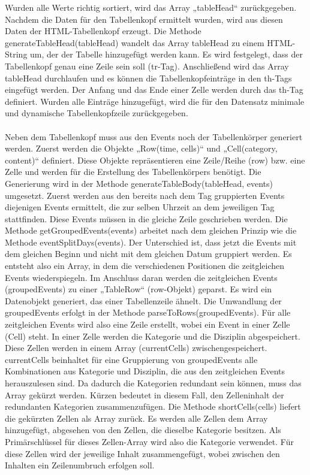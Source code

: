 Wurden alle Werte richtig sortiert, wird das Array „tableHead“ zurückgegeben.
Nachdem die Daten für den Tabellenkopf ermittelt wurden, wird aus diesen Daten der HTML-Tabellenkopf erzeugt. Die Methode generateTableHead(tableHead) wandelt das Array tableHead zu einem HTML-String um, der der Tabelle hinzugefügt werden kann. Es wird festgelegt, dass der Tabellenkopf genau eine Zeile sein soll (tr-Tag). Anschließend wird das Array tableHead durchlaufen und es können die Tabellenkopfeinträge in den th-Tags eingefügt werden. Der Anfang und das Ende einer Zelle werden durch das th-Tag definiert. Wurden alle Einträge hinzugefügt, wird die für den Datensatz minimale und dynamische Tabellenkopfzeile zurückgegeben.\\
\\
Neben dem Tabellenkopf muss aus den Events noch der Tabellenkörper generiert werden. Zuerst werden die Objekte „Row(time, cells)“ und „Cell(category, content)“ definiert. Diese Objekte repräsentieren eine Zeile/Reihe (row) bzw. eine Zelle und werden für die Erstellung des Tabellenkörpers benötigt. 
Die Generierung wird in der Methode generateTableBody(tableHead, events) umgesetzt. Zuerst werden aus den bereits nach dem Tag gruppierten Events diejenigen Events ermittelt, die zur selben Uhrzeit an dem jeweiligen Tag stattfinden. Diese Events müssen in die gleiche Zeile geschrieben werden. Die Methode getGroupedEvents(events) arbeitet nach dem gleichen Prinzip wie die Methode eventSplitDays(events). Der Unterschied ist, dass jetzt die Events mit dem gleichen Beginn und nicht mit dem gleichen Datum gruppiert werden. Es entsteht also ein Array, in dem die verschiedenen Positionen die zeitgleichen Events wiederspiegeln.
Im Anschluss daran werden die zeitgleichen Events (groupedEvents) zu einer „TableRow“ (row-Objekt) geparst. Es wird ein Datenobjekt generiert, das einer Tabellenzeile ähnelt. Die Umwandlung der groupedEvents erfolgt in der Methode parseToRows(groupedEvents). Für alle zeitgleichen Events wird also eine Zeile erstellt, wobei ein Event in einer Zelle (Cell) steht. In einer Zelle werden die Kategorie und die Disziplin abgespeichert. Diese Zellen werden in einem Array (currentCells) zwischengespeichert. currentCells beinhaltet für eine Gruppierung von groupedEvents alle Kombinationen aus Kategorie und Disziplin, die aus den zeitgleichen Events herauszulesen sind. Da dadurch die Kategorien redundant sein können, muss das Array gekürzt werden. Kürzen bedeutet in diesem Fall, den Zelleninhalt der redundanten Kategorien zusammenzufügen.
Die Methode shortCells(cells) liefert die gekürzten Zellen als Array zurück. Es werden alle Zellen dem Array hinzugefügt, abgesehen von den Zellen, die dieselbe Kategorie besitzen. Als Primärschlüssel für dieses Zellen-Array wird also die Kategorie verwendet. Für diese Zellen wird der jeweilige Inhalt zusammengefügt, wobei zwischen den Inhalten ein Zeilenumbruch erfolgen soll. 
